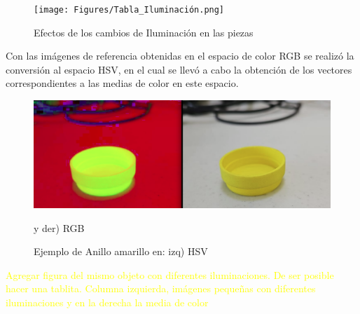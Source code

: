 \begin{figure}[H]
\centering
\texttt{[image: Figures/Tabla\_Iluminación.png]}
    \caption{Efectos de los cambios de Iluminación en las piezas}
    \label{fig:Ilumination}
\end{figure}

Con las imágenes de referencia obtenidas en el espacio de color RGB se realizó la conversión al espacio HSV, en el cual se llevó a cabo la obtención de los vectores correspondientes a las medias de color en este espacio.

\begin{figure}[H]
\centering
\includegraphics[scale= 0.3]{Figures/HSV_YellowRing.png}
    \caption{Ejemplo de Anillo amarillo en: izq) HSV} y der) RGB
    \label{fig:YellowRing_HSV}
\end{figure}

\textcolor{yellow}{Agregar figura del mismo objeto con diferentes iluminaciones. De ser posible hacer una tablita. Columna izquierda, imágenes pequeñas con diferentes iluminaciones y en la derecha la media de color}

